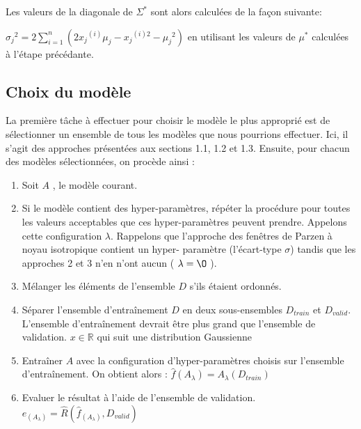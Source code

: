 \documentclass[a4paper,10pt]{article}
\begin{document}
Les valeurs de la diagonale de $\Sigma^*$ sont alors calculées de la façon suivante:

$ {\sigma_j}^2 = 2 \sum_{i = 1}^{n}(2 {x_j}^{(i)}  \mu_j - {x_j}^{(i)2} - {\mu_j}^2)$ en utilisant les valeurs de $\mu^*$ calculées à l'étape précédante.

\subsection{Choix du modèle}

La première tâche à effectuer pour choisir le modèle le plus approprié est de sélectionner un ensemble de tous les modèles que nous pourrions effectuer. Ici, il s'agit des approches présentées aux sections 1.1, 1.2 et 1.3. Ensuite, pour chacun des modèles sélectionnées, on procède ainsi :

\begin{enumerate}
	\item Soit $A$ , le modèle courant.
	\item Si le modèle contient des hyper-paramètres, répéter la procédure pour toutes les valeurs acceptables que ces hyper-paramètres peuvent prendre. Appelons cette configuration $\lambda$. Rappelons que l'approche des fenêtres de Parzen à noyau isotropique contient un hyper- paramètre (l'écart-type $\sigma$) tandis que les approches 2 et 3 n'en n'ont aucun ( $\lambda= \O$ ).
	\item Mélanger les éléments de l'ensemble $D$ s'ils étaient ordonnés.
	\item Séparer l'ensemble d'entraînement $D$ en deux sous-ensembles $D_{train}$ et $D_{valid}$. L'ensemble d’entraînement devrait être plus grand que l'ensemble de validation. $x \in \mathds{R}$ qui suit une distribution Gaussienne
	\item Entraîner $A$ avec la configuration d'hyper-paramètres choisis sur l'ensemble d'entraînement. On obtient alors : $\widehat{f} (A_{\lambda})=A_{\lambda}(D_{train})$
	\item Evaluer le résultat à l'aide de l'ensemble de validation. $e_{(A_{\lambda})} = \widehat{R} ( \widehat{f}_{(A_{\lambda})} , D_{valid} )$
\end{enumerate}
\end{document}
